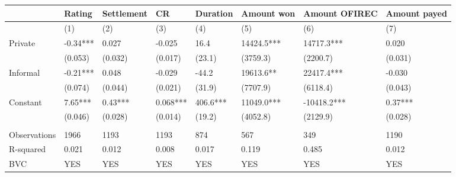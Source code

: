 \begin{tabular}{llllllll}
\toprule
      & Rating & Settlement & CR    & Duration & Amount won & Amount OFIREC & Amount payed \\
\midrule
      & (1)   & (2)   & (3)   & (4)   & (5)   & (6)   & (7) \\
\midrule
\midrule
Private & -0.34*** & 0.027 & -0.025 & 16.4  & 14424.5*** & 14717.3*** & 0.020 \\
      & (0.053) & (0.032) & (0.017) & (23.1) & (3759.3) & (2200.7) & (0.031) \\
Informal & -0.21*** & 0.048 & -0.029 & -44.2 & 19613.6** & 22417.4*** & -0.030 \\
      & (0.074) & (0.044) & (0.021) & (31.9) & (7707.9) & (6118.4) & (0.043) \\
Constant & 7.65*** & 0.43*** & 0.068*** & 406.6*** & 11049.0*** & -10418.2*** & 0.37*** \\
      & (0.046) & (0.028) & (0.014) & (19.2) & (4052.8) & (2129.9) & (0.028) \\
      &       &       &       &       &       &       &  \\
\midrule
Observations & 1966  & 1193  & 1193  & 874   & 567   & 349   & 1190 \\
R-squared & 0.021 & 0.012 & 0.008 & 0.017 & 0.119 & 0.485 & 0.012 \\
BVC   & YES   & YES   & YES   & YES   & YES   & YES   & YES \\
\bottomrule
\bottomrule
\end{tabular}%
